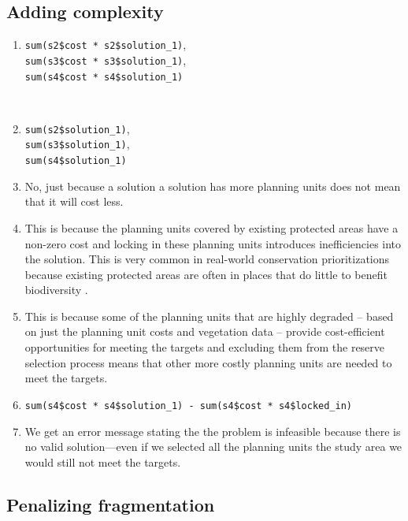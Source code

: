 \documentclass[
  12pt,
]{book}
\makeatletter
\providecommand{\tightlist}{%
  \setlength{\itemsep}{0pt}\setlength{\parskip}{0pt}}
\newenvironment{kframe}{%
\medskip{}
\setlength{\fboxsep}{.8em}
 \def\at@end@of@kframe{}%
 \ifinner\ifhmode%
  \def\at@end@of@kframe{\end{minipage}}%
  \begin{minipage}{\columnwidth}%
 \fi\fi%
 \def\FrameCommand##1{\hskip\@totalleftmargin \hskip-\fboxsep
 \colorbox{shadecolor}{##1}\hskip-\fboxsep
     \hskip-\linewidth \hskip-\@totalleftmargin \hskip\columnwidth}%
 \MakeFramed {\advance\hsize-\width
   \@totalleftmargin\z@ \linewidth\hsize
   \@setminipage}}%
 {\par\unskip\endMakeFramed%
 \at@end@of@kframe}
\newenvironment{rmdblock}[1]
  {
  \begin{itemize}
  \renewcommand{\labelitemi}{
    \raisebox{-.7\height}[0pt][0pt]{
      {\setkeys{Gin}{width=3em,keepaspectratio}\texttt{[image: images/\#1]}}
    }
  }
  \setlength{\fboxsep}{1em}
  \begin{kframe}
  \item
  }
  {
  \end{kframe}
  \end{itemize}
  }
\newenvironment{rmdanswer}
  {\begin{rmdblock}{answer}}
  {\end{rmdblock}}
\makeatother
\begin{document}
\hypertarget{adding-complexity-1}{%
\subsection{Adding complexity}\label{adding-complexity-1}}

\begin{rmdanswer}
\begin{enumerate}
\def\labelenumi{\arabic{enumi}.}
\tightlist
\item
  \texttt{sum(s2\$cost\ *\ s2\$solution\_1)},\\
  \texttt{sum(s3\$cost\ *\ s3\$solution\_1)},\\
  \texttt{sum(s4\$cost\ *\ s4\$solution\_1)}\strut \\
\item
  \texttt{sum(s2\$solution\_1)},\\
  \texttt{sum(s3\$solution\_1)},\\
  \texttt{sum(s4\$solution\_1)}
\item
  No, just because a solution a solution has more planning units does not mean that it will cost less.
\item
  This is because the planning units covered by existing protected areas have a non-zero cost and locking in these planning units introduces inefficiencies into the solution. This is very common in real-world conservation prioritizations because existing protected areas are often in places that do little to benefit biodiversity \citep{r3}.
\item
  This is because some of the planning units that are highly degraded -- based on just the planning unit costs and vegetation data -- provide cost-efficient opportunities for meeting the targets and excluding them from the reserve selection process means that other more costly planning units are needed to meet the targets.
\item
  \texttt{sum(s4\$cost\ *\ s4\$solution\_1)\ -\ sum(s4\$cost\ *\ s4\$locked\_in)}
\item
  We get an error message stating the the problem is infeasible because there is no valid solution---even if we selected all the planning units the study area we would still not meet the targets.
\end{enumerate}
\end{rmdanswer}

\hypertarget{penalizing-fragmentation-1}{%
\subsection{Penalizing fragmentation}\label{penalizing-fragmentation-1}}
\end{document}
